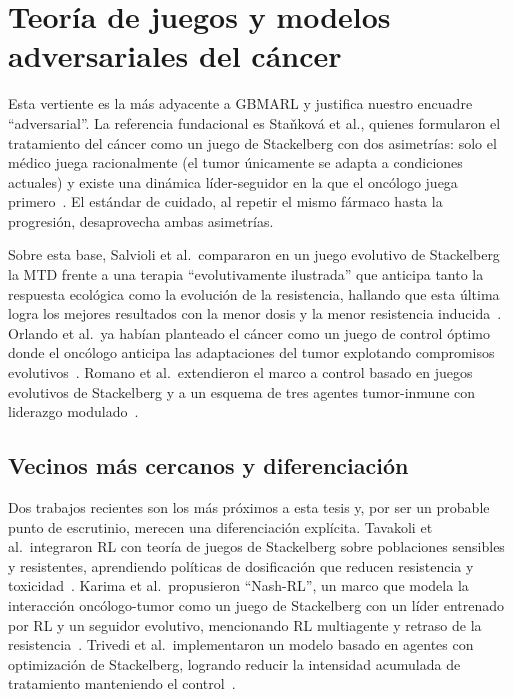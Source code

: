 \section{Teoría de juegos y modelos adversariales del cáncer}
\label{sec:teoria-juegos}

Esta vertiente es la más adyacente a GBMARL y justifica nuestro encuadre ``adversarial''. La referencia fundacional es Staňková et al., quienes formularon el tratamiento del cáncer como un juego de Stackelberg con dos asimetrías: solo el médico juega racionalmente (el tumor únicamente se adapta a condiciones actuales) y existe una dinámica líder-seguidor en la que el oncólogo juega primero~\cite{Stankova2019}. El estándar de cuidado, al repetir el mismo fármaco hasta la progresión, desaprovecha ambas asimetrías.

Sobre esta base, Salvioli et al.\ compararon en un juego evolutivo de Stackelberg la MTD frente a una terapia ``evolutivamente ilustrada'' que anticipa tanto la respuesta ecológica como la evolución de la resistencia, hallando que esta última logra los mejores resultados con la menor dosis y la menor resistencia inducida~\cite{Salvioli2024}. Orlando et al.\ ya habían planteado el cáncer como un juego de control óptimo donde el oncólogo anticipa las adaptaciones del tumor explotando compromisos evolutivos~\cite{Orlando2012}. Romano et al.\ extendieron el marco a control basado en juegos evolutivos de Stackelberg y a un esquema de tres agentes tumor-inmune con liderazgo modulado~\cite{Romano2024,Romano2025}.

\subsection{Vecinos más cercanos y diferenciación}
\label{subsec:vecinos}

Dos trabajos recientes son los más próximos a esta tesis y, por ser un probable punto de escrutinio, merecen una diferenciación explícita. Tavakoli et al.\ integraron RL con teoría de juegos de Stackelberg sobre poblaciones sensibles y resistentes, aprendiendo políticas de dosificación que reducen resistencia y toxicidad~\cite{Tavakoli2025}. Karima et al.\ propusieron ``Nash-RL'', un marco que modela la interacción oncólogo-tumor como un juego de Stackelberg con un líder entrenado por RL y un seguidor evolutivo, mencionando RL multiagente y retraso de la resistencia~\cite{Karima2025}. Trivedi et al.\ implementaron un modelo basado en agentes con optimización de Stackelberg, logrando reducir la intensidad acumulada de tratamiento manteniendo el control~\cite{Trivedi2025}.

